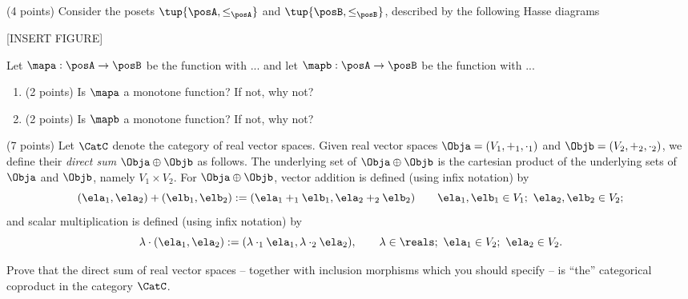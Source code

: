\documentclass[paper=8.125in:10.250in,pagesize=pdftex,
    headinclude=false,footinclude=false,oneside,egregdoesnotlikesansseriftitles]{kaobook}
\begin{document}
\begin{gradedexercise}\label{ex:MonotoneMaps}
 (4 points) Consider the posets $\tup{\posA, \leq_\posA}$ and $\tup{\posB, \leq_\posB}$, described by the following Hasse diagrams
 
 [INSERT FIGURE]
 
Let $\mapa: \posA \to \posB$ be the function with ... and let $\mapb: \posA \to \posB$ be the function with ... 
\begin{enumerate}
\item (2 points) Is $\mapa$ a monotone function? If not, why not? 
\item (2 points) Is $\mapb$ a monotone function? If not, why not? 
\end{enumerate}
 
\end{gradedexercise}



\newpage


\begin{gradedexercise}\label{ex:DirectSumCopr}
(7 points) Let $\CatC$ denote the category of real vector spaces. Given real vector spaces $\Obja = (V_1, +_1, \cdot_1)$ and $\Objb = (V_2, +_2, \cdot_2)$, we define their \emph{direct sum} $\Obja \oplus \Objb$ as follows. 
The underlying set of $\Obja \oplus \Objb$ is the cartesian product of the underlying sets of $\Obja$ and $\Objb$, namely $V_1 \times V_2$. For $\Obja \oplus \Objb$, vector addition is defined (using infix notation) by
$$(\ela_1, \ela_2) + (\elb_1, \elb_2) := (\ela_1 +_1 \elb_1, \ela_2 +_2 \elb_2) \quad \quad \ela_1, \elb_1 \in V_1; \ \ela_2, \elb_2 \in V_2;$$
and scalar multiplication is defined (using infix notation) by
$$\lambda \cdot (\ela_1, \ela_2) := (\lambda \cdot_1 \ela_1, \lambda \cdot_2 \ela_2), \quad \quad \lambda \in \reals; \ \ela_1 \in V_2; \ \ela_2 \in V_2.$$

Prove that the direct sum of real vector spaces -- together with inclusion morphisms which you should specify -- is ``the'' categorical coproduct in the category $\CatC$. 
\end{gradedexercise}


\newpage
\end{document}
